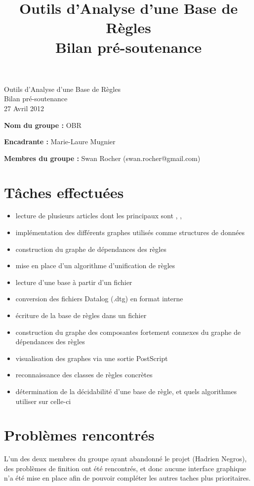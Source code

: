 \documentclass[a4paper]{article}
\title{Outils d'Analyse d'une Base de Règles\\Bilan pré-soutenance}
\begin{document}
\setlength{\parskip}{5mm plus2mm minus2mm}
\begin{center}
	\Huge 
	Outils d'Analyse d'une Base de Règles\\
	\huge
	Bilan pré-soutenance\\
	\Large
	27 Avril 2012
\end{center}

\large

{\bfseries Nom du groupe :} OBR

{\bfseries Encadrante :} Marie-Laure Mugnier

{\bfseries Membres du groupe :} Swan Rocher (swan.rocher@gmail.com)

\section{Tâches effectuées}\label{tasks}
\begin{itemize}
	\item lecture de plusieurs articles dont les principaux sont 
	\cite{walking}, \cite{nonguarded}, \cite{ontological11}
	\item implémentation des différents graphes utilisés comme structures de données 
	\item construction du graphe de dépendances des règles
	\item mise en place d'un algorithme d'unification de règles
	\item lecture d'une base à partir d'un fichier
	\item conversion des fichiers Datalog (.dtg) en format interne
	\item écriture de la base de règles dans un fichier
	\item construction du graphe des composantes fortement connexes du graphe de
	dépendances des règles
	\item visualisation des graphes via une sortie PostScript 
	\item reconnaissance des classes de règles concrètes
	\item détermination de la décidabilité d'une base de règle, et quels algorithmes utiliser
	sur celle-ci
\end{itemize}

\section{Problèmes rencontrés}\label{problems}
L'un des deux membres du groupe ayant abandonné le projet (Hadrien Negros),
des problèmes de finition
ont été rencontrés,
et donc aucune interface graphique n'a été mise en place afin de
pouvoir compléter les autres taches plus prioritaires.




\vfill
\end{document}
